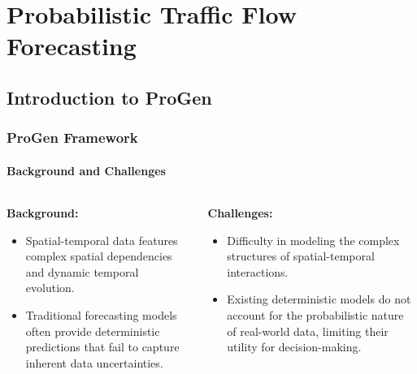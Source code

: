 \documentclass[light]{lutbeamer} %
\begin{document}
\section{Probabilistic Traffic Flow Forecasting}

\subsection{Introduction to ProGen}
\begin{frame}
    \frametitle{ProGen Framework}
    \framesubtitle{Background and Challenges}

    \begin{columns}[T]
        \begin{column}{0.48\textwidth}
            \textbf{Background:}
            \begin{itemize}
                \item Spatial-temporal data features complex spatial dependencies and dynamic temporal evolution.
                \item Traditional forecasting models often provide deterministic predictions that fail to capture inherent data uncertainties.
            \end{itemize}
        \end{column}
        \begin{column}{0.48\textwidth}
            \textbf{Challenges:}
            \begin{itemize}
                \item Difficulty in modeling the complex structures of spatial-temporal interactions.
                \item Existing deterministic models do not account for the probabilistic nature of real-world data, limiting their utility for decision-making.
            \end{itemize}
        \end{column}
    \end{columns}
\end{frame}
\end{document}
